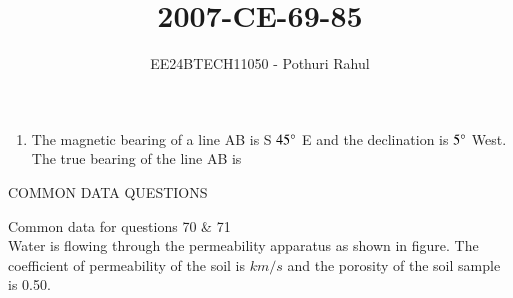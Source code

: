 \documentclass[journal]{IEEEtran}
\begin{document}

\vspace{3cm}
\title{2007-CE-69-85}
\author{EE24BTECH11050 - Pothuri Rahul}
{\let\newpage\relax\maketitle}
\renewcommand{\thefigure}{\theenumi}
\renewcommand{\thetable}{\theenumi}
\setlength{\intextsep}{10pt} %
\renewcommand{\thetable}{\theenumi}
\begin{enumerate}[start=69]
\item %
The magnetic bearing of a line AB is S $45\degree$ E and the declination is $5\degree$ West. The true bearing of the line AB is 
\begin{enumerate}
\end{enumerate}
\end{enumerate}
\begin{center}
    COMMON DATA QUESTIONS
\end{center}
Common data for questions 70 \& 71 \\
Water is flowing through the permeability apparatus as shown in figure. The coefficient of permeability of the soil is $k m/s$ and the porosity of the soil sample is 0.50.
\end{document}

